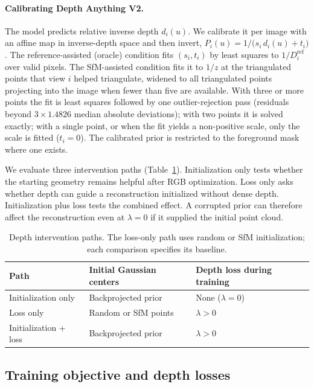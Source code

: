 \documentclass[10pt,a4paper]{article}
\begin{document}
\paragraph{Calibrating Depth Anything V2.} The model predicts relative inverse depth
$d_i(u)$. We calibrate it per image with an affine map in inverse-depth space and
then invert, $P_i(u)=1/\bigl(s_i\,d_i(u)+t_i\bigr)$. The reference-assisted (oracle)
condition fits $(s_i,t_i)$ by least squares to $1/D_i^{\mathrm{ref}}$ over valid
pixels. The SfM-assisted condition fits it to $1/z$ at the triangulated points that
view $i$ helped triangulate, widened to all triangulated points projecting into the
image when fewer than five are available. With three or more points the fit is least
squares followed by one outlier-rejection pass (residuals beyond
$3\times1.4826$ median absolute deviations); with two points it is solved exactly;
with a single point, or when the fit yields a non-positive scale, only the scale is
fitted ($t_i=0$). The calibrated prior is restricted to the foreground mask where one
exists.

We evaluate three intervention paths (Table~\ref{tab:paths}). Initialization only
tests whether the starting geometry remains helpful after RGB optimization. Loss only
asks whether depth can guide a reconstruction initialized without dense depth.
Initialization plus loss tests the combined effect. A corrupted prior can therefore
affect the reconstruction even at $\lambda=0$ if it supplied the initial point cloud.

\begin{table}[!htbp]\centering\small
\caption{Depth intervention paths. The loss-only path uses random or SfM
initialization; each comparison specifies its baseline.}
\label{tab:paths}
\begin{tabular}{lll}
\toprule
Path & Initial Gaussian centers & Depth loss during training\\
\midrule
Initialization only & Backprojected prior & None ($\lambda=0$)\\
Loss only & Random or SfM points & $\lambda>0$\\
Initialization + loss & Backprojected prior & $\lambda>0$\\
\bottomrule
\end{tabular}
\end{table}

\subsection{Training objective and depth losses}
\end{document}
